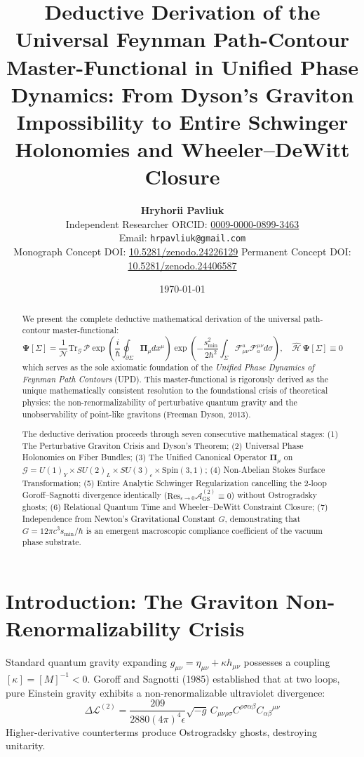 \documentclass[11pt,a4paper]{article}
\title{\textbf{Deductive Derivation of the Universal Feynman Path-Contour Master-Functional in Unified Phase Dynamics: From Dyson's Graviton Impossibility to Entire Schwinger Holonomies and Wheeler--DeWitt Closure}}
\author{\textbf{Hryhorii Pavliuk}\\[0.4em]
\small Independent Researcher \quad\textbar\quad \small ORCID: \href{https://orcid.org/0009-0000-0899-3463}{0009-0000-0899-3463}\\
\small Email: \texttt{hrpavliuk@gmail.com} \\[0.2em]
\small Monograph Concept DOI: \href{https://doi.org/10.5281/zenodo.24226129}{10.5281/zenodo.24226129} \quad Permanent Concept DOI: \href{https://doi.org/10.5281/zenodo.24406587}{10.5281/zenodo.24406587}}
\date{\today}
\begin{document}
\maketitle

\begin{abstract}
We present the complete deductive mathematical derivation of the universal path-contour master-functional:
\begin{equation}
\mathbf{\Psi}[\Sigma] = \frac{1}{\mathcal{N}} \mathrm{Tr}_{\mathcal{G}} \, \mathcal{P} \exp \left( \frac{i}{\hbar} \oint_{\partial \Sigma} \mathbf{\Pi}_\mu dx^\mu \right) \exp \left( - \frac{s_{\min}^2}{2\hbar^2} \int_\Sigma \mathcal{F}_{\mu\nu}^a \mathcal{F}^{\mu\nu}_a d\sigma \right), \quad \hat{\mathcal{H}} \, \mathbf{\Psi}[\Sigma] \equiv 0
\end{equation}
which serves as the sole axiomatic foundation of the \textit{Unified Phase Dynamics of Feynman Path Contours} (UPD). This master-functional is rigorously derived as the unique mathematically consistent resolution to the foundational crisis of theoretical physics: the non-renormalizability of perturbative quantum gravity and the unobservability of point-like gravitons (Freeman Dyson, 2013).

The deductive derivation proceeds through seven consecutive mathematical stages:
(1) The Perturbative Graviton Crisis and Dyson's Theorem; 
(2) Universal Phase Holonomies on Fiber Bundles; 
(3) The Unified Canonical Operator $\mathbf{\Pi}_\mu$ on $\mathcal{G} = U(1)_Y \times SU(2)_L \times SU(3)_c \times \mathrm{Spin}(3,1)$; 
(4) Non-Abelian Stokes Surface Transformation; 
(5) Entire Analytic Schwinger Regularization cancelling the 2-loop Goroff--Sagnotti divergence identically ($\mathrm{Res}_{\epsilon \to 0} \mathcal{A}_{\text{GS}}^{(2)} \equiv 0$) without Ostrogradsky ghosts; 
(6) Relational Quantum Time and Wheeler--DeWitt Constraint Closure; 
(7) Independence from Newton's Gravitational Constant $G$, demonstrating that $G = 12\pi c^3 s_{\min} / \hbar$ is an emergent macroscopic compliance coefficient of the vacuum phase substrate.
\end{abstract}

\section{Introduction: The Graviton Non-Renormalizability Crisis}
Standard quantum gravity expanding $g_{\mu\nu} = \eta_{\mu\nu} + \kappa h_{\mu\nu}$ possesses a coupling $[\kappa] = [M]^{-1} < 0$. Goroff and Sagnotti (1985) established that at two loops, pure Einstein gravity exhibits a non-renormalizable ultraviolet divergence:
\begin{equation}
\Delta \mathcal{L}^{(2)} = \frac{209}{2880 (4\pi)^4 \epsilon} \sqrt{-g} \, C_{\mu\nu\rho\sigma} C^{\rho\sigma\alpha\beta} C_{\alpha\beta}{}^{\mu\nu}
\end{equation}
Higher-derivative counterterms produce Ostrogradsky ghosts, destroying unitarity.
\end{document}

